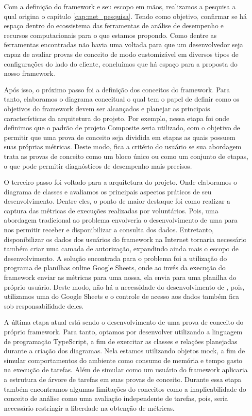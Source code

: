 \documentclass[12pt]{tcc}
\begin{document}
Com a definição do framework e seu escopo em mãos, realizamos a pesquisa a qual origina o capítulo \ref{cap:met_pesquisa}.
Tendo como objetivo, confirmar se há espaço dentro do ecossistema das ferramentas de análise de desempenho e recursos computacionais para o que estamos propondo.
Como dentre as ferramentas encontradas não havia uma voltada para que um desenvolvedor seja capaz de avaliar provas de conceito de modo customizável em diversos tipos de configurações do lado do cliente, concluímos que há espaço para a proposta do nosso framework.

Após isso, o próximo passo foi a definição dos conceitos do framework.
Para tanto, elaboramos o diagrama conceitual o qual tem o papel de definir como os objetivos do framework devem ser alcançados e planejar as principais características da arquitetura do projeto.
Por exemplo, nessa etapa foi onde definimos que o padrão de projeto Composite seria utilizado, com o objetivo de permitir que uma prova de conceito seja dividida em etapas as quais possuem suas próprias métricas.
Deste modo, fica a critério do usuário se sua abordagem trata as provas de conceito como um bloco único ou como um conjunto de etapas, o que pode permitir diagnósticos de desempenho mais precisos.

O terceiro passo foi voltado para a arquitetura do projeto.
Onde elaboramos o diagrama de classes e avaliamos os principais aspectos práticos de seu desenvolvimento.
Dentre eles, o ponto de maior destaque foi como realizar a captura das métricas de execuções realizadas por voluntários.
Pois, uma abordagem tradicional ao problema envolveria o desenvolvimento de uma  para nos permitir receber e disponibilizar a consulta dos dados.
Entretanto, disponibilizar os dados dos usuários do framework na Internet tornaria necessário também criar uma camada de autorização, expandindo ainda mais o escopo de desenvolvimento.
A solução encontrada para o problema foi a utilização do programa de planilhas online Google Sheets, onde ao invés da execução do framework enviar as métricas para uma  nossa, ela envia para uma planilha do próprio usuário.
Deste modo, não há a necessidade do desenvolvimento de , pois, utilizamos uma do Google Sheets e o controle de acesso aos dados também fica sob responsabilidade deles.

A última etapa atual está sendo o desenvolvimento de uma prova de conceito do próprio framework.
Para tanto, optamos por desenvolver utilizando a linguagem de programação TypeScript, a fim de exercitar as classes e relações planejadas durante a criação dos diagramas.
Nela estamos utilizando objetos mock, a fim de simular comportamentos do ambiente como consumo de memória e tempo gasto na execução de tarefas.
Além de simular como um usuário do framework aplicaria a estrutura de árvore de tarefas em suas provas de conceito.
Durante essa etapa também encontramos algumas limitações do conceitos como a inaplicabilidade do conceito de análise como uma avaliação independente de tarefas, pois, seria necessário restringir a liberdade na obtenção de métricas.
\end{document}
